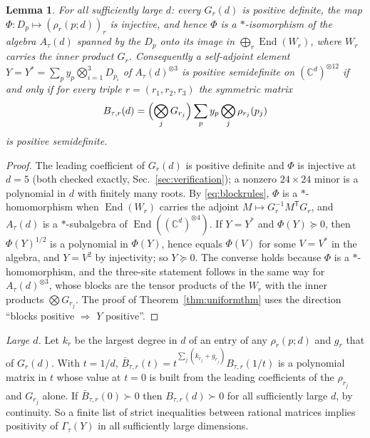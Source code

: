 \documentclass[aps,pra,twocolumn,superscriptaddress,nofootinbib,longbibliography]{revtex4-2}
\newcommand{\C}{\mathbb C}
\DeclareMathOperator{\End}{End}
\newcommand{\T}{\mathsf T}
\theoremstyle{plain}
\newtheorem{lemma}[theorem]{Lemma}
\theoremstyle{definition}
\theoremstyle{remark}
\begin{document}
\begin{lemma}\label{lem:blocks}
For all sufficiently large $d$: every $G_r(d)$ is positive definite, the map $\Phi:D_p\mapsto(\rho_r(p;d))_r$ is injective, and hence $\Phi$ is a $*$-isomorphism of the algebra $A_\tau(d)$ spanned by the $D_p$ onto its image in $\bigoplus_r\End(W_r)$, where $W_r$ carries the inner product $G_r$. Consequently a self-adjoint element $Y=Y^*=\sum_py_p\bigotimes_{i=1}^3D_{p_i}$ of $A_\tau(d)^{\otimes3}$ is positive semidefinite on $(\C^d)^{\otimes12}$ if and only if for every triple $r=(r_1,r_2,r_3)$ the symmetric matrix
\begin{equation}\label{eq:Bblock}
B_{\tau,r}(d)=\Bigl(\bigotimes_jG_{r_j}\Bigr)\sum_py_p\bigotimes_j\rho_{r_j}(p_j)
\end{equation}
is positive semidefinite.
\end{lemma}
\begin{proof}
The leading coefficient of $G_r(d)$ is positive definite and $\Phi$ is injective at $d=5$ (both checked exactly, Sec.~\ref{sec:verification}); a nonzero $24\times24$ minor is a polynomial in $d$ with finitely many roots. By \eqref{eq:blockrules}, $\Phi$ is a $*$-homomorphism when $\End(W_r)$ carries the adjoint $M\mapsto G_r^{-1}M^\T G_r$, and $A_\tau(d)$ is a $*$-subalgebra of $\End((\C^d)^{\otimes4})$. If $Y=Y^*$ and $\Phi(Y)\succeq0$, then $\Phi(Y)^{1/2}$ is a polynomial in $\Phi(Y)$, hence equals $\Phi(V)$ for some $V=V^*$ in the algebra, and $Y=V^2$ by injectivity; so $Y\succeq0$. The converse holds because $\Phi$ is a $*$-homomorphism, and the three-site statement follows in the same way for $A_\tau(d)^{\otimes3}$, whose blocks are the tensor products of the $W_r$ with the inner products $\bigotimes G_{r_j}$. The proof of Theorem~\ref{thm:uniformthm} uses the direction ``blocks positive $\Rightarrow$ $Y$ positive''.
\end{proof}

\emph{Large $d$.} Let $k_r$ be the largest degree in $d$ of an entry of any $\rho_r(p;d)$ and $g_r$ that of $G_r(d)$. With $t=1/d$, $\bar B_{\tau,r}(t)=t^{\sum_j(k_{r_j}+g_{r_j})}B_{\tau,r}(1/t)$ is a polynomial matrix in $t$ whose value at $t=0$ is built from the leading coefficients of the $\rho_{r_j}$ and $G_{r_j}$ alone. If $\bar B_{\tau,r}(0)\succ0$ then $B_{\tau,r}(d)\succ0$ for all sufficiently large $d$, by continuity. So a finite list of strict inequalities between rational matrices implies positivity of $\Gamma_\tau(Y)$ in all sufficiently large dimensions.
\end{document}
